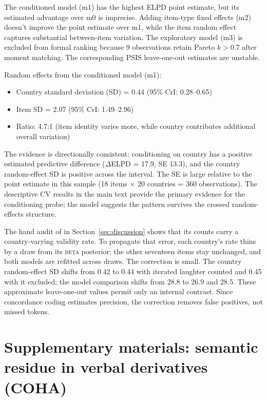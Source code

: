 \documentclass[12pt]{article}
\begin{document}
The conditioned model (m1) has the highest ELPD point estimate, but its
estimated advantage over m0 is imprecise. Adding item-type fixed effects (m2)
doesn't improve the point estimate over m1, while the item random effect
captures substantial between-item variation. The exploratory model (m3) is excluded
from formal ranking because 9 observations retain Pareto $k > 0.7$
after moment matching. The corresponding PSIS leave-one-out estimates are
unstable.

Random effects from the conditioned model (m1):
\begin{itemize}
  \item Country standard deviation (SD) = 0.44 (95\% CrI: 0.28--0.65)
  \item Item SD = 2.07 (95\% CrI: 1.49--2.96)
  \item Ratio: 4.7:1 (item identity varies more, while country contributes
    additional overall variation)
\end{itemize}

The evidence is directionally consistent: conditioning on country has a
positive estimated predictive difference ($\Delta$ELPD = 17.9, SE 13.3), and the country
random-effect SD is positive across the interval. The SE is large
relative to the point estimate in this sample (18 items $\times$ 20
countries = 360 observations). The descriptive CV results in the main
text provide the primary evidence for the conditioning probe; the model
suggests the pattern survives the crossed random-effects structure.

The hand audit of  in Section~\ref{sec:discussion} shows that its
counts carry a country-varying validity rate. To propagate that error, each
country's rate thins  by a draw from its \textsc{beta} posterior;
the other seventeen items stay unchanged, and both models are refitted across
draws. The correction is small. The country random-effect SD shifts from 0.42
to 0.44 with iterated laughter counted and 0.45 with it excluded; the model
comparison shifts from 28.8 to 26.9 and 28.5. These approximate
leave-one-out values permit only an internal contrast. Since concordance
coding estimates precision, the correction removes false positives, not
missed tokens.

\clearpage
\section[Semantic residue in COHA]{Supplementary materials: semantic residue in verbal derivatives (COHA)}
\label{app:morphgain}
\end{document}
